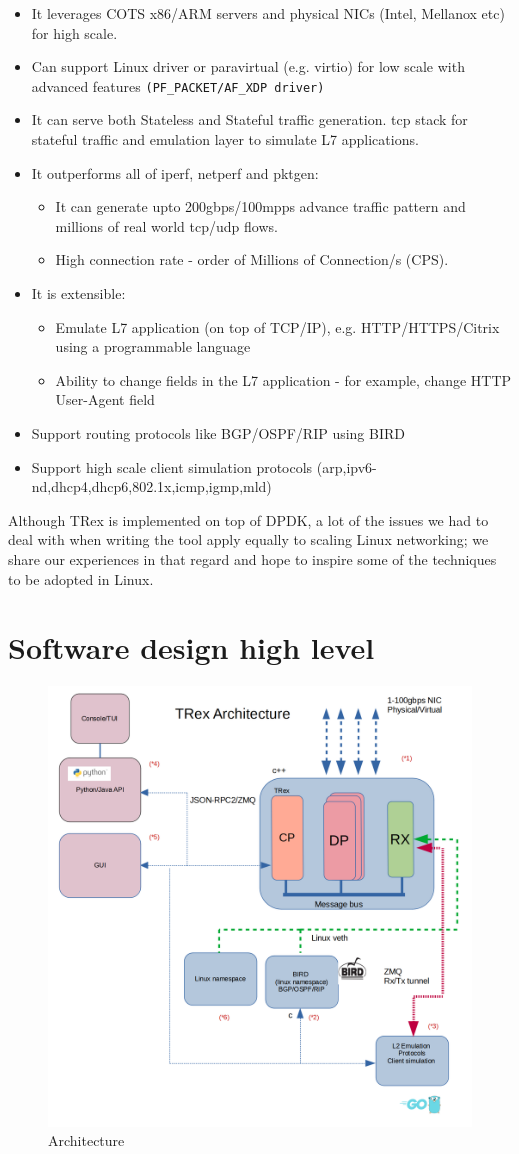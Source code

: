 \documentclass[conference]{IEEEtran}
\begin{document}
\begin{itemize}
\item It leverages COTS x86/ARM servers and physical NICs (Intel, Mellanox etc) for high scale.
\item Can support Linux driver or paravirtual (e.g. virtio) for low scale with advanced features \texttt{(PF\_PACKET/AF\_XDP driver)}
\item It can serve both Stateless and Stateful traffic generation.
  tcp stack for stateful traffic and emulation layer to simulate L7 applications.
\item It outperforms all of iperf, netperf and pktgen: 
   \begin{itemize}
    \item It can generate upto 200gbps/100mpps advance traffic pattern and millions of real
      world tcp/udp flows.
    \item High connection rate - order of Millions of Connection/s (CPS).
  \end{itemize}
\item It is extensible:
\begin{itemize}
    \item Emulate L7 application (on top of TCP/IP),
       e.g. HTTP/HTTPS/Citrix using a programmable language
    \item Ability to change fields in the L7 application - for example,
      change HTTP User-Agent field
\end{itemize}
\item Support routing protocols like BGP/OSPF/RIP using BIRD \cite{b4}
\item Support high scale client simulation protocols (arp,ipv6-nd,dhcp4,dhcp6,802.1x,icmp,igmp,mld) 
\end{itemize}
Although TRex is implemented on top of DPDK, a lot of the issues we had
to deal with when writing the tool apply equally to scaling Linux networking;
we share our experiences in that regard and hope to inspire some
of the techniques to be adopted in Linux.

\section{Software design high level}

\begin{figure}[h]
\includegraphics[width=0.4
\textwidth, center]{trex_arch_2.png}
\caption{Architecture}
\label{fig:arch}
\end{figure}
\end{document}
